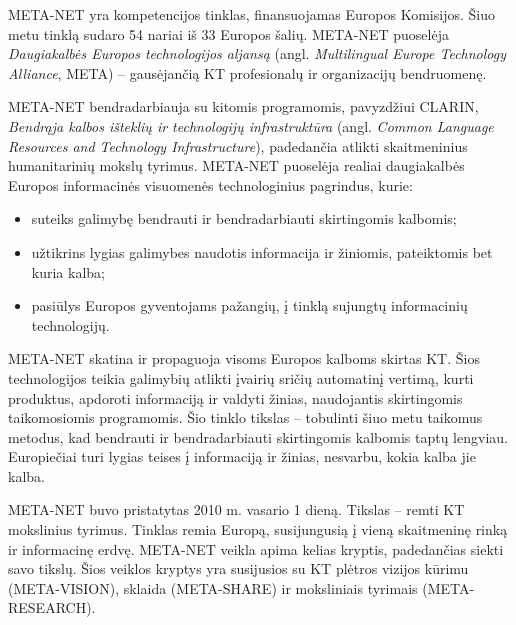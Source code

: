 \documentclass[]{../metanetpaper}
\begin{document}

\begin{multicols}{2}

META-NET yra kompetencijos tinklas, finansuojamas Europos Komisijos. Šiuo metu tinklą sudaro 54 nariai iš 33 Europos šalių. META-NET puoselėja \textit{Daugiakalbės Europos technologijos aljansą} (angl. \textit{Multilingual Europe Technology Alliance}, META) – gausėjančią KT profesionalų ir organizacijų bendruomenę.

META-NET bendradarbiauja su kitomis programomis, pavyzdžiui CLARIN, \textit{Bendrąja kalbos išteklių ir technologijų infrastruktūra} (angl. \textit{Common Language Resources and Technology Infrastructure}), padedančia atlikti skaitmeninius humanitarinių mokslų tyrimus. META-NET puoselėja realiai daugiakalbės Europos informacinės visuomenės technologinius pagrindus, kurie:

\begin{itemize}
\item suteiks galimybę bendrauti ir bendradarbiauti skirtingomis kalbomis;
\item užtikrins lygias galimybes naudotis informacija ir žiniomis, pateiktomis bet kuria kalba;
\item pasiūlys Europos gyventojams pažangių, į tinklą sujungtų informacinių technologijų.
\end{itemize}

META-NET skatina ir propaguoja visoms Europos kalboms skirtas KT. Šios technologijos teikia galimybių atlikti įvairių sričių automatinį vertimą, kurti produktus, apdoroti informaciją ir valdyti žinias, naudojantis skirtingomis taikomosiomis programomis. Šio tinklo tikslas – tobulinti šiuo metu taikomus metodus, kad bendrauti ir bendradarbiauti skirtingomis kalbomis taptų lengviau. Europiečiai turi lygias teises į informaciją ir žinias, nesvarbu, kokia kalba jie kalba.

META-NET buvo pristatytas 2010 m. vasario 1 dieną. Tikslas – remti KT mokslinius tyrimus. Tinklas remia Europą, susijungusią į vieną skaitmeninę rinką ir informacinę erdvę. META-NET veikla apima kelias kryptis, padedančias siekti savo tikslų. Šios veiklos kryptys yra susijusios su KT plėtros vizijos kūrimu (META-VISION), sklaida (META-SHARE) ir moksliniais tyrimais (META-RESEARCH).   


\end{multicols}
\end{document}
